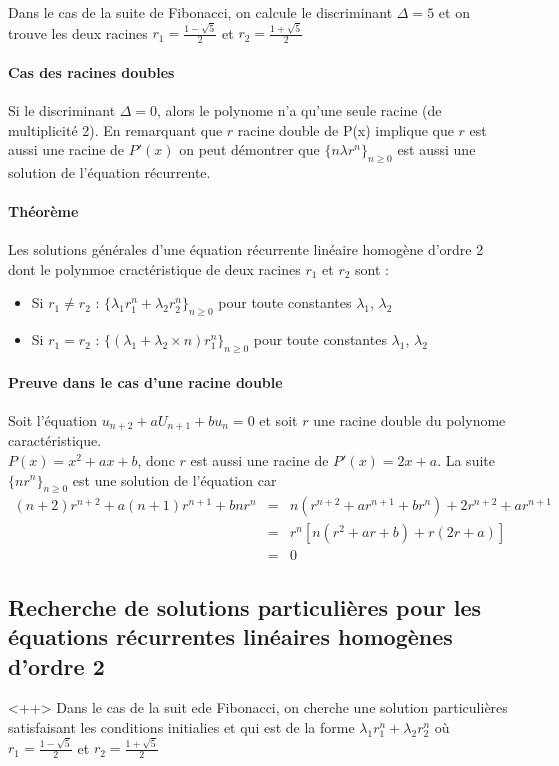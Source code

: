 	Dans le cas de la suite de Fibonacci, on calcule le discriminant $\Delta=5$ et on trouve les deux racines $r_1 = \frac{1-\sqrt{5}}{2}$ et 
	$r_2=\frac{1+\sqrt{5}}{2}$

	\paragraph{Cas des racines doubles} Si le discriminant $\Delta = 0$, alors le polynome n'a qu'une seule racine (de multiplicité 2). En remarquant
	que $r$ racine double de P(x) implique que $r$ est aussi une racine de $P'(x)$ on peut démontrer que $\{n\lambda r^n\}_{n \geq 0}$ est aussi une
	solution de l'équation récurrente.

	\paragraph{Théorème} Les solutions générales d'une équation récurrente linéaire homogène d'ordre 2 dont le polynmoe cractéristique de deux racines
	$r_1$ et $r_2$ sont :
	\begin{itemize}
		\item Si $r_1 \neq r_2$ : $\{ \lambda_1 r_1^n + \lambda_2 r_2^n\}_{n \geq 0}$ pour toute constantes $\lambda_1$, $\lambda_2$
		\item Si $r_1 = r_2$ :  $\{(\lambda_1 + \lambda_2 \times n)r_1^n\}_{n \geq 0}$ pour toute constantes $\lambda_1$, $\lambda_2$
	\end{itemize}

	\paragraph{Preuve dans le cas d'une racine double}
	Soit l'équation $u_{n+2} + a U_{n+1} + bu_n = 0$ et soit $r$ une racine double du polynome caractéristique.\\  
	$P(x) = x^2 + ax + b$, donc $r$ est aussi une racine de $P'(x)= 2x+a$. La suite $\{nr^n\}_{n\geq 0}$ est une solution de l'équation car
	\begin{eqnarray*}
	(n+2)r^{n+2} + a(n+1)r^{n+1} + bnr^n &=& n(r^{n+2} + ar^{n+1} + br^n) + 2r^{n+2} + ar^{n+1}\\
	&=& r^n[n(r^2 + ar + b) + r(2r+a)]\\
	&=& 0
	\end{eqnarray*}
	\subsection{Recherche de solutions particulières pour les équations récurrentes linéaires homogènes d'ordre 2}<++>
	Dans le cas de la suit ede Fibonacci, on cherche une solution particulières satisfaisant les conditions initialies et qui est de la forme
	$\lambda_1r_1^n + \lambda_2r_2^n$ où $r_1 = \frac{1-\sqrt{5}}{2}$ et $r_2 = \frac{1+\sqrt{5}}{2}$

